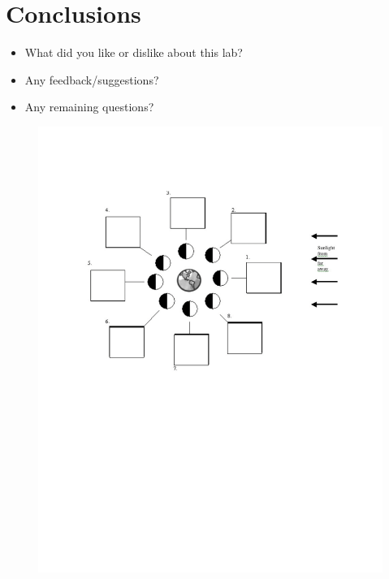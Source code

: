 \documentclass[11pt]{article}%
\begin{document}
\section{Conclusions}
\begin{itemize}
\item What did you like or dislike about this lab?  
\item Any feedback/suggestions?
\item Any remaining questions?
\end{itemize}

\begin{center}
\begin{figure}
    \centering
    \includegraphics[width=1.1\textwidth]{moon_diagram.png}
    \label{fig:my_label}
\end{figure}
    
\end{center}
\end{document}
